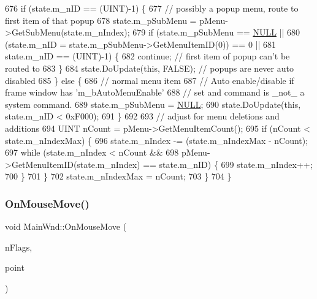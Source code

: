 \begin{DoxyCode}
676     \textcolor{keywordflow}{if} (state.m\_nID == (UINT)-1) \{
677       \textcolor{comment}{// possibly a popup menu, route to first item of that popup}
678       state.m\_pSubMenu = pMenu->GetSubMenu(state.m\_nIndex);
679       \textcolor{keywordflow}{if} (state.m\_pSubMenu == \mbox{\hyperlink{getopt1_8c_a070d2ce7b6bb7e5c05602aa8c308d0c4}{NULL}} ||
680           (state.m\_nID = state.m\_pSubMenu->GetMenuItemID(0)) == 0 ||
681           state.m\_nID == (UINT)-1) \{
682         \textcolor{keywordflow}{continue};       \textcolor{comment}{// first item of popup can't be routed to}
683       \}
684       state.DoUpdate(\textcolor{keyword}{this}, FALSE);    \textcolor{comment}{// popups are never auto disabled}
685     \} \textcolor{keywordflow}{else} \{
686       \textcolor{comment}{// normal menu item}
687       \textcolor{comment}{// Auto enable/disable if frame window has 'm\_bAutoMenuEnable'}
688       \textcolor{comment}{//    set and command is \_not\_ a system command.}
689       state.m\_pSubMenu = \mbox{\hyperlink{getopt1_8c_a070d2ce7b6bb7e5c05602aa8c308d0c4}{NULL}};
690       state.DoUpdate(\textcolor{keyword}{this}, state.m\_nID < 0xF000);
691     \}
692     
693     \textcolor{comment}{// adjust for menu deletions and additions}
694     UINT nCount = pMenu->GetMenuItemCount();
695     \textcolor{keywordflow}{if} (nCount < state.m\_nIndexMax) \{
696       state.m\_nIndex -= (state.m\_nIndexMax - nCount);
697       \textcolor{keywordflow}{while} (state.m\_nIndex < nCount &&
698              pMenu->GetMenuItemID(state.m\_nIndex) == state.m\_nID) \{
699         state.m\_nIndex++;
700       \}
701     \}
702     state.m\_nIndexMax = nCount;
703   \}
704 \}
\end{DoxyCode}
\mbox{\label{class_main_wnd_a487d640fdc35218fbe8fd5d917cb104f}} 
\subsubsection{\texorpdfstring{On\+Mouse\+Move()}{OnMouseMove()}}
{\footnotesize\ttfamily void Main\+Wnd\+::\+On\+Mouse\+Move (\begin{DoxyParamCaption}\item[{U\+I\+NT}]{n\+Flags,  }\item[{C\+Point}]{point }\end{DoxyParamCaption})\hspace{0.3cm}{\ttfamily [protected]}}



